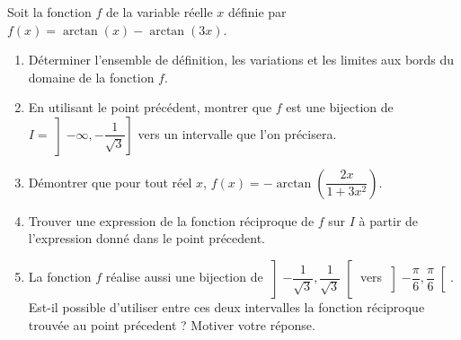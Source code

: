 
\begin{exercice}\label{exoautoanalyseCTU-46}

Soit la fonction $f$ de la variable réelle $x$ définie par $f(x)=\arctan (x) - \arctan (3x)$.
\begin{enumerate}
    \item Déterminer l'ensemble de définition, les variations et les limites aux bords du domaine de la fonction $f$.
    \item En utilisant le point précédent, montrer que $f$ est une bijection de $I=\left]-\infty, -\dfrac{1}{\sqrt{3}}\right]$ vers un intervalle que l'on précisera.
    \item Démontrer que pour tout réel $x$, $f(x)=-\arctan \left(\dfrac{2x}{1+3x^2}\right)$. 
    \item Trouver une expression de la fonction réciproque de $f$ sur $I$ à partir de l'expression donné dans le point précedent. 
    \item La fonction $f$ réalise aussi une bijection de $\left] -\dfrac{1}{\sqrt{3}}, \dfrac{1}{\sqrt{3}}\right[$ vers $\left] -\dfrac{\pi}{6},\dfrac{\pi}{6}\right[$. Est-il possible d'utiliser entre ces deux intervalles la fonction réciproque trouvée au point précedent ? Motiver votre réponse.
\end{enumerate}

\end{exercice}

